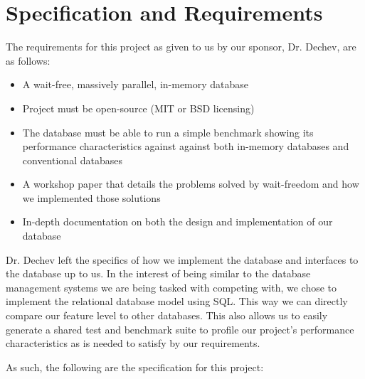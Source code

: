 \documentclass[letterpaper, 12pt]{article}
\begin{document}
\section{Specification and Requirements}
The requirements for this project as given to us by our sponsor, Dr. Dechev, are as follows:
\begin{itemize}
 \item A wait-free, massively parallel, in-memory database
 \item Project must be open-source (MIT or BSD licensing)
 \item The database must be able to run a simple benchmark showing its performance characteristics against
 against both in-memory databases and conventional databases
 \item A workshop paper that details the problems solved by wait-freedom and how we
 implemented those solutions
 \item In-depth documentation on both the design and implementation of our database
\end{itemize}
\par\vspace{\baselineskip}
Dr. Dechev left the specifics of how we implement the database and interfaces to the database
up to us. In the interest of being similar to the database management systems we are being
tasked with competing with, we chose to implement the relational database model using SQL. This way we
can directly compare our feature level to other databases. This also allows us to easily generate
a shared test and benchmark suite to profile our project's performance characteristics as is needed
to satisfy by our requirements.
\par\vspace{\baselineskip}
As such, the following are the specification for this project:
\end{document}
